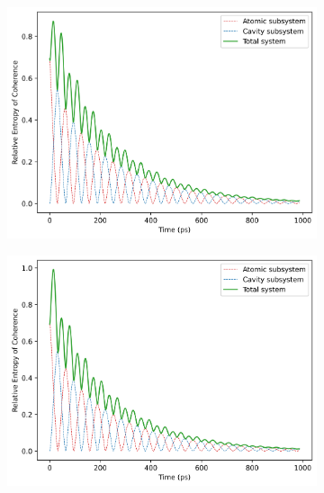 \documentclass[11pt]{article}
\begin{document}
\begin{figure}[H]
    \centering
    \begin{subfigure}{0.45\textwidth}
        \centering
        \includegraphics[width=0.85\linewidth]{Research Project/Code/results/JCM/OQS_Coh_Spont_eg.png}
        \caption{}
        \label{fig:JCM_OQS_Coh_Spont_eg}
    \end{subfigure}
    \hfill
    \begin{subfigure}{0.45\textwidth}
        \centering
        \includegraphics[width=0.85\linewidth]{Research Project/Code/results/JCM/OQS_Coh_Therm_eg.png}
        \caption{}
        \label{fig:JCM_OQS_Coh_Therm_eg}
    \end{subfigure}
    
    \vspace{0.5cm}
    

\end{figure}
\end{document}
